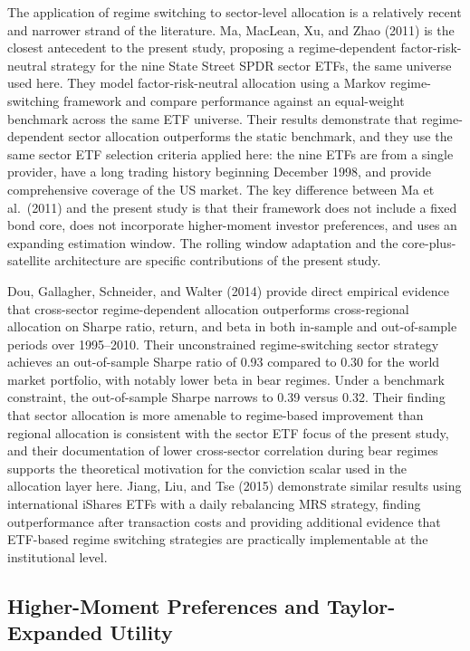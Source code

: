 \documentclass[12pt, a4paper]{article}
\begin{document}
The application of regime switching to sector-level allocation is a relatively recent and
narrower strand of the literature. Ma, MacLean, Xu, and Zhao (2011) is the closest antecedent
to the present study, proposing a regime-dependent factor-risk-neutral strategy for the nine
State Street SPDR sector ETFs, the same universe used here. They model factor-risk-neutral
allocation using a Markov regime-switching framework and compare performance against an
equal-weight benchmark across the same ETF universe. Their results demonstrate that
regime-dependent sector allocation outperforms the static benchmark, and they use the same
sector ETF selection criteria applied here: the nine ETFs are from a single provider, have a
long trading history beginning December 1998, and provide comprehensive coverage of the US
market. The key difference between Ma et al.\ (2011) and the present study is that their
framework does not include a fixed bond core, does not incorporate higher-moment investor
preferences, and uses an expanding estimation window. The rolling window adaptation and the
core-plus-satellite architecture are specific contributions of the present study.

Dou, Gallagher, Schneider, and Walter (2014) provide direct empirical evidence that
cross-sector regime-dependent allocation outperforms cross-regional allocation on Sharpe ratio,
return, and beta in both in-sample and out-of-sample periods over 1995--2010. Their
unconstrained regime-switching sector strategy achieves an out-of-sample Sharpe ratio of 0.93
compared to 0.30 for the world market portfolio, with notably lower beta in bear regimes.
Under a benchmark constraint, the out-of-sample Sharpe narrows to 0.39 versus 0.32. Their
finding that sector allocation is more amenable to regime-based improvement than regional
allocation is consistent with the sector ETF focus of the present study, and their
documentation of lower cross-sector correlation during bear regimes supports the theoretical
motivation for the conviction scalar used in the allocation layer here. Jiang, Liu, and
Tse (2015) demonstrate similar results using international iShares ETFs with a daily
rebalancing MRS strategy, finding outperformance after transaction costs and providing
additional evidence that ETF-based regime switching strategies are practically implementable
at the institutional level.

\subsection{Higher-Moment Preferences and Taylor-Expanded Utility}
\end{document}
